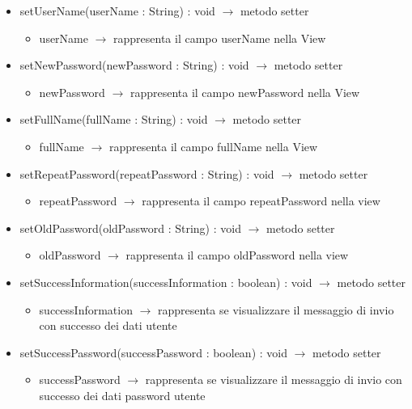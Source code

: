 \begin{description}
\begin{itemize}
	\item setUserName(userName : String) : void $\rightarrow$ metodo setter\begin{itemize}
		\item userName $\rightarrow$ rappresenta il campo userName nella View
	\end{itemize}
	
	\item setNewPassword(newPassword : String) : void $\rightarrow$ metodo setter\begin{itemize}
		\item newPassword $\rightarrow$ rappresenta il campo newPassword nella View	
	\end{itemize}
	
	\item setFullName(fullName : String) : void $\rightarrow$ metodo setter\begin{itemize}
		\item fullName $\rightarrow$ rappresenta il campo fullName nella View
	\end{itemize}
	
	\item setRepeatPassword(repeatPassword : String) : void $\rightarrow$ metodo setter\begin{itemize}
		\item repeatPassword $\rightarrow$ rappresenta il campo repeatPassword nella view	
	\end{itemize}
	
	\item setOldPassword(oldPassword : String) : void $\rightarrow$ metodo setter\begin{itemize}
		\item oldPassword $\rightarrow$ rappresenta il campo oldPassword nella view
	\end{itemize}
	
	\item setSuccessInformation(successInformation : boolean) : void $\rightarrow$ metodo setter\begin{itemize}
		\item successInformation $\rightarrow$ rappresenta se visualizzare il messaggio di invio con successo dei dati utente
	\end{itemize}
	
	\item setSuccessPassword(successPassword : boolean) : void $\rightarrow$ metodo setter\begin{itemize}
		\item successPassword $\rightarrow$ rappresenta se visualizzare il messaggio di invio con successo dei dati password utente
	\end{itemize}
	
\end{itemize}

\end{description}


